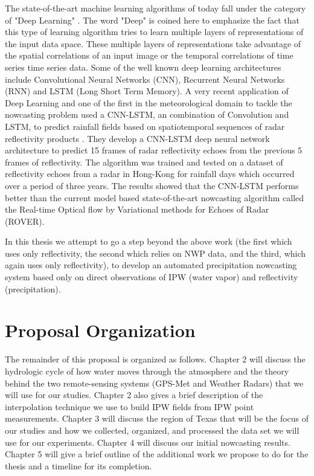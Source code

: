 \documentclass[proposal]{umassthesis}
\begin{document}
The state-of-the-art machine learning algorithms of today fall under the category of "Deep Learning" \cite{arel2010deep}. The word "Deep" is coined here to emphasize the fact that this type of learning algorithm tries to learn multiple layers of representations of the input data space. These multiple layers of representations take advantage of the spatial correlations of an input image or the temporal correlations of time series time series data. Some of the well known deep learning architectures include Convolutional Neural Networks (CNN), Recurrent Neural Networks (RNN) and LSTM (Long Short Term Memory). A very recent application of Deep Learning and one of the first in the meteorological domain to tackle the nowcasting problem used a CNN-LSTM, an combination of Convolution and LSTM, to predict rainfall fields based on spatiotemporal sequences of radar reflectivity products \cite{shi2015convolutional}. They develop a CNN-LSTM deep neural network architecture to predict 15 frames of radar reflectivity echoes from the previous 5 frames of reflectivity. The algorithm was trained and tested on a dataset of reflectivity echoes from a radar in Hong-Kong for rainfall days which occurred over a period of three years. The results showed that the CNN-LSTM performs better than the current model based state-of-the-art nowcasting algorithm called the Real-time Optical flow by Variational methods for Echoes of Radar (ROVER). 

In this thesis we attempt to go a step beyond the above work (the first which uses only reflectivity, the second which relies on NWP data, and the third, which again uses only reflectivity), to develop an automated precipitation nowcasting system based only on direct observations of IPW (water vapor) and reflectivity (precipitation).

\section{Proposal Organization}

The remainder of this proposal is organized as follows. Chapter 2 will discuss the hydrologic cycle of how water moves through the atmosphere and the theory behind the two remote-sensing systems (GPS-Met and Weather Radars) that we will use for our studies. Chapter 2 also gives a brief description of the interpolation technique we use to build IPW fields from IPW point measurements. Chapter 3 will discuss the region of Texas that will be the focus of our studies and how we collected, organized, and processed the data set we will use for our experiments. Chapter 4 will discuss our initial nowcasting results. Chapter 5 will give a brief outline of the additional work we propose to do for the thesis and a timeline for its completion.
\end{document}

